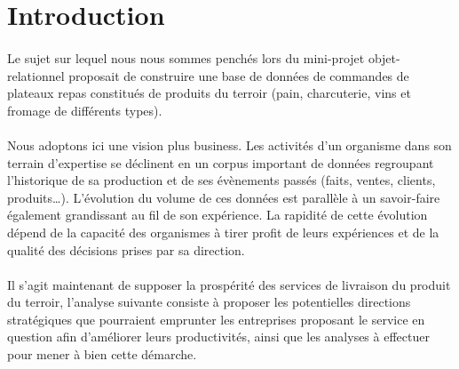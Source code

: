 \section{Introduction}

\paragraph{} Le sujet sur lequel nous nous sommes penchés lors du mini-projet objet-relationnel proposait de construire une base de données de commandes de plateaux repas constitués de produits du terroir (pain, charcuterie, vins et fromage de différents types).

\paragraph{} Nous adoptons ici une vision plus business. Les activités d’un organisme dans son terrain d’expertise se déclinent en un corpus important de données regroupant l’historique de sa production et de ses évènements passés (faits, ventes, clients, produits…).
L’évolution du volume de ces données est parallèle à un savoir-faire également grandissant au fil de son expérience. La rapidité de cette évolution dépend de la capacité des organismes à tirer profit de leurs expériences et de la qualité des décisions prises par sa direction.

\paragraph{} Il s’agit maintenant de supposer la prospérité des services de livraison du produit du terroir, l’analyse suivante consiste à proposer les potentielles directions stratégiques que pourraient emprunter les entreprises proposant le service en question afin d’améliorer leurs productivités, ainsi que les analyses à effectuer pour mener à bien cette démarche.